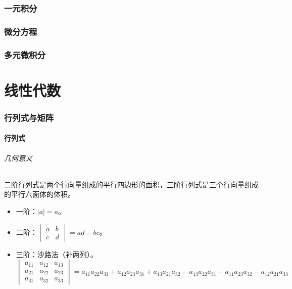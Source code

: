 \documentclass[
12pt, %
a4paper, 
oneside, %
]{scrartcl}
\begin{document}
\section{一元积分}
\section{微分方程}
\section{多元微积分}
\newpage
\part{线性代数}
\section{行列式与矩阵}
\subsection[行列式]{行列式}
\paragraph{几何意义}
二阶行列式是两个行向量组成的平行四边形的面积，三阶行列式是三个行向量组成的平行六面体的体积。
\begin{itemize}
\item 一阶：$ |a| = a $。
\item 二阶：$ \begin{vmatrix} a & b \\ c & d \end{vmatrix} = ad - bc $。
\item 三阶：沙路法（补两列）。
$$ \begin{vmatrix} a_{11} & a_{12} & a_{13} \\ a_{21} & a_{22} & a_{23} \\ a_{31} & a_{32} & a_{33} \end{vmatrix} = a_{11}a_{22}a_{33} + a_{12}a_{23}a_{31} + a_{13}a_{21}a_{32} - a_{13}a_{22}a_{31} - a_{11}a_{23}a_{32} - a_{12}a_{21}a_{33} $$
\end{itemize}
\end{document}
